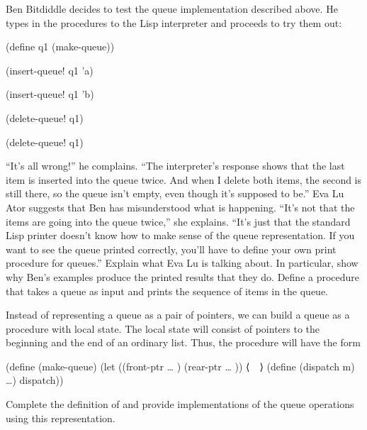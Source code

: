 \begin{exercise}
	\label{Exercise 3.21}
	Ben Bitdiddle decides to test the queue implementation described above.
	He types in the procedures to the Lisp interpreter and proceeds to try them out:
	\begin{scheme}
	  (define q1 (make-queue))

	  (insert-queue! q1 'a)
	  ~~

	  (insert-queue! q1 'b)
	  ~~

	  (delete-queue! q1)
	  ~~

	  (delete-queue! q1)
	  ~~
	\end{scheme}
	“It’s all wrong!” he complains.
	“The interpreter’s response shows that the last item is inserted into the queue twice.
	And when I delete both items, the second  is still there, so the queue isn’t empty, even though it’s supposed to be.”
	Eva Lu Ator suggests that Ben has misunderstood what is happening.
	“It’s not that the items are going into the queue twice,” she explains.
	“It’s just that the standard Lisp printer doesn’t know how to make sense of the queue representation.
	If you want to see the queue printed correctly, you’ll have to define your own print procedure for queues.”
	Explain what Eva Lu is talking about.
	In particular, show why Ben’s examples produce the printed results that they do.
	Define a procedure  that takes a queue as input and prints the sequence of items in the queue.
\end{exercise}



\begin{exercise}
	\label{Exercise 3.22}
	Instead of representing a queue as a pair of pointers, we can build a queue as a procedure with local state.
	The local state will consist of pointers to the beginning and the end of an ordinary list.
	Thus, the  procedure will have the form
	\begin{scheme}
	  (define (make-queue)
	    (let ((front-ptr … )
	          (rear-ptr … ))
	      ⟨~~⟩
	      (define (dispatch m) …)
	      dispatch))
	\end{scheme}
	Complete the definition of  and provide implementations of the queue operations using this representation.
\end{exercise}




